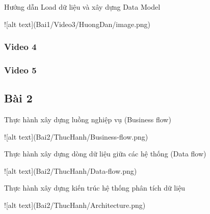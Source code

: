 \documentclass{article}
\begin{document}
\caption{Hướng dẫn Load dữ liệu và xây dựng Data Model }
![alt text](Bai1/Video3/HuongDan/image.png)




\subsubsection{Video 4}

\subsubsection{Video 5}

\subsection{Bài 2}

\caption{Thực hành xây dựng luồng nghiệp vụ (Business flow)}
![alt text](Bai2/ThucHanh/Business-flow.png)
\caption{Thực hành xây dựng dòng dữ liệu giữa các hệ thống (Data flow)}
![alt text](Bai2/ThucHanh/Data-flow.png)
\caption{Thực hành xây dựng kiến trúc hệ thống phân tích dữ liệu}
![alt text](Bai2/ThucHanh/Architecture.png)

\end{document}
